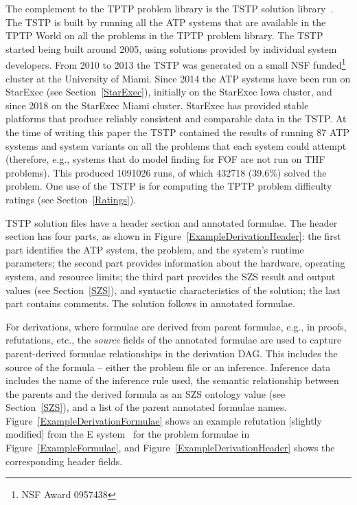 \documentclass{easychair}
\begin{document}
The complement to the TPTP problem library is the TSTP solution library~\cite{Sut07-CSR,Sut10}.
The TSTP is built by running all the ATP systems that are available in the TPTP World on
all the problems in the TPTP problem library.
The TSTP started being built around 2005, using solutions provided by individual system developers.
From 2010 to 2013 the TSTP was generated on a small NSF funded\footnote{%
NSF Award 0957438} cluster at the University of Miami.
Since 2014 the ATP systems have been run on StarExec (see Section~\ref{StarExec}), initially on 
the StarExec Iowa cluster, and since 2018 on the StarExec Miami cluster.
StarExec has provided stable platforms that produce reliably consistent and comparable data in 
the TSTP.
At the time of writing this paper the TSTP contained the results of running 87 ATP systems and 
system variants on all the problems that each system could attempt
(therefore, e.g., systems that do model finding for FOF are not run on THF problems).
This produced 1091026 runs, of which 432718 (39.6\%) solved the problem.
One use of the TSTP is for computing the TPTP problem difficulty ratings (see 
Section~\ref{Ratings}).

TSTP solution files have a header section and annotated formulae.
The header section has four parts, as shown in Figure~\ref{ExampleDerivationHeader}:
the first part identifies the ATP system, the problem, and the system's runtime parameters; 
the second part provides information about the hardware, operating system, and resource limits; 
the third part provides the SZS result and output values (see Section~\ref{SZS}), and syntactic 
characteristics of the solution; the last part contains comments.
The solution follows in annotated formulae.

For derivations, where formulae are derived from parent formulae, e.g., in proofs, refutations, 
etc., the {\em source} fields of the annotated formulae are used to capture parent-derived 
formulae relationships in the derivation DAG.
This includes the source of the formula -- either the problem file or an inference.
Inference data includes the name of the inference rule used, the semantic relationship between 
the parents and the derived formula as an SZS ontology value (see Section~\ref{SZS}), and a 
list of the parent annotated formulae names.
Figure~\ref{ExampleDerivationFormulae} shows an example refutation [slightly modified] from the 
E system~\cite{SCV19} for the problem formulae in Figure~\ref{ExampleFormulae}, and 
Figure~\ref{ExampleDerivationHeader} shows the corresponding header fields.
\end{document}

